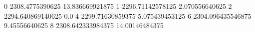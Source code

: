 0 2308.4775390625 13.836669921875
1 2296.71142578125 2.070556640625
2 2294.640869140625 0.0
4 2299.71630859375 5.075439453125
6 2304.096435546875 9.45556640625
8 2308.642333984375 14.00146484375
